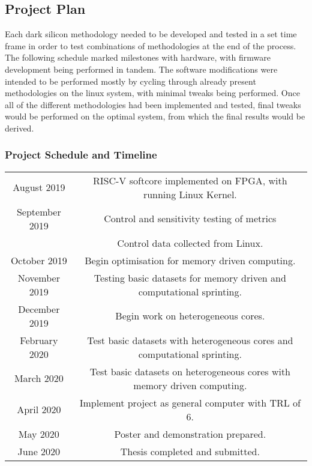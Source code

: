 	\subsection{Project Plan}
		Each dark silicon methodology needed to be developed and tested in a set time frame in order to test combinations of methodologies at the end of the process. The following schedule marked milestones with hardware, with firmware development being performed in tandem. The software modifications were intended to be performed mostly by cycling through already present methodologies on the linux system, with minimal tweaks being performed. Once all of the different methodologies had been implemented and tested, final tweaks would be performed on the optimal system, from which the final results would be derived.
		\subsubsection{Project Schedule and Timeline}
		
		\begin{center}
		\begin{tabular}{ c|c }
		August 2019 & RISC-V softcore implemented on FPGA, with running Linux Kernel.\\
		September 2019 & Control and sensitivity testing of metrics \\ & Control data collected from Linux.\\
		October 2019 & Begin optimisation for memory driven computing.\\
		November 2019 & Testing basic datasets for memory driven and computational sprinting.\\
		December 2019 & Begin work on heterogeneous cores.\\
		February 2020 & Test basic datasets with heterogeneous cores and computational sprinting.\\
		March 2020 & Test basic datasets on heterogeneous cores with memory driven computing.\\
		April 2020 & Implement project as general computer with TRL of 6.\\
		May 2020 & Poster and demonstration prepared.\\
		June 2020 & Thesis completed and submitted.\\
		\end{tabular}
		\end{center}
	
